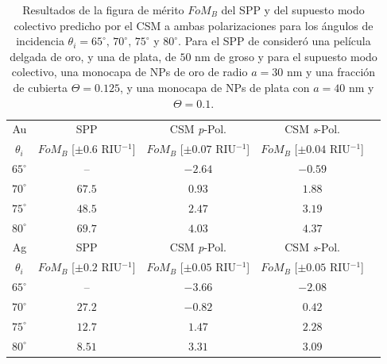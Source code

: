 \begin{table}[h!]
\centering
\caption{Resultados de la figura de mérito $\textit{FoM}_B$ del SPP y del supuesto modo colectivo predicho por el CSM a ambas polarizaciones para los ángulos de incidencia $\theta_i = 65^\circ,\,70^\circ,\, 75^\circ$ y $80^\circ$. Para el SPP de consideró una película delgada de oro, y una de plata, de $50$ nm de groso y para el supuesto modo colectivo, una monocapa de NPs de oro de radio $a=30$ nm y una fracción de cubierta $\Theta=0.125$, y una monocapa de NPs de plata con $a=40$ nm y $\Theta=0.1$.}\vspace*{-.7em}
\label{tab:FOM}\small
\begin{tabular}{c||c||ccc}
Au & SPP  & CSM \emph{p}-Pol. 	& CSM \emph{s}-Pol. \\ 
$\theta_i$ &  $\textit{FoM}_B$ [$\pm 0.6$ RIU$^{-1}$]	  &  $\textit{FoM}_B$ [$\pm 0.07$ RIU$^{-1}$]		&  $\textit{FoM}_B$  [$\pm 0.04$ RIU$^{-1}$]\\ \hline
$65^\circ$ & --			  &	$-2.64$ & $-0.59$\\
$70^\circ$ & $67.5$ &	$0.93$ & $1.88$\\
$75^\circ$ & $48.5$ &	$2.47$ & $3.19$\\
$80^\circ$ & $69.7$ &	$4.03$ & $4.37$\\
\hline \hline
Ag & SPP  & CSM \emph{p}-Pol. 	& CSM \emph{s}-Pol. \\ 
$\theta_i$ &  $\textit{FoM}_B$ [$\pm 0.2$ RIU$^{-1}$]	  &  $\textit{FoM}_B$ [$\pm 0.05$ RIU$^{-1}$]		&  $\textit{FoM}_B$  [$\pm 0.05$ RIU$^{-1}$]\\ \hline
$65^\circ$ & -- 			  &	$-3.66$ & $-2.08$\\
$70^\circ$ & $27.2$ &	$-0.82$ & $0.42$\\
$75^\circ$ & $12.7$ &	$1.47$  & $2.28$\\
$80^\circ$ & $8.51$ &	$3.31$  & $3.09$
\end{tabular}
\end{table}
